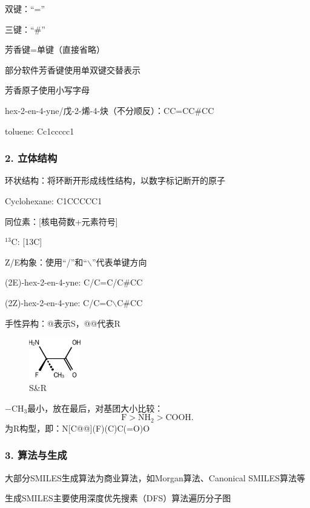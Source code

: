 双键：“=”

三键：“\#”

芳香键=单键（直接省略）
\begin{notation}
    部分软件芳香键使用单双键交替表示

    芳香原子使用小写字母
\end{notation}
\begin{eg}
    hex-2-en-4-yne/戊-2-烯-4-炔（不分顺反）：CC=CC\#CC

    toluene: Cc1ccccc1
\end{eg}
\subsubsection*{2. 立体结构}%
\label{subsub:2-立体结构}
环状结构：将环断开形成线性结构，以数字标记断开的原子
\begin{eg}
    Cyclohexane: C1CCCCC1
\end{eg}
同位素：[核电荷数+元素符号]
\begin{eg}
    $^{13}\text{C}$: [13C]
\end{eg}
Z/E构象：使用“/”和“$\backslash$”代表单键方向
\begin{eg}
    (2E)-hex-2-en-4-yne: C/C=C/C\#CC

    (2Z)-hex-2-en-4-yne: C/C=C$\backslash$C\#CC
\end{eg}
手性异构：@表示S，@@代表R
\begin{eg}
\begin{figure}[htpb]
    \centering
    \includegraphics[width=0.2\textwidth]{fig/S&R}
    \caption{S\&R}
    \label{fig:fig-S-R}
\end{figure}
$-\text{CH}_{3}$最小，放在最后，对基团大小比较：
\[
    \text{F}>\text{NH}_{2}>\text{COOH}
.\] 
为R构型，即：N[C@@](F)(C)C(=O)O
\end{eg}
\subsubsection*{3. 算法与生成}%
\label{subsub:3-算法与生成}
\begin{notation}
    大部分SMILES生成算法为商业算法，如Morgan算法、Canonical SMILES算法等

    生成SMILES主要使用深度优先搜素（DFS）算法遍历分子图
\end{notation}

